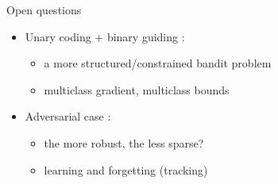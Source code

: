 \documentclass{beamer}
\begin{document}
%	
%		

\begin{frame}{Open questions}
	
	\begin{itemize}
		\item Unary coding + binary guiding :
		\begin{itemize}
			\item a more structured/constrained bandit problem
			\item multiclass gradient, multiclass bounds
		\end{itemize}
		\item Adversarial case :
		\begin{itemize}
			\item the more robust, the less sparse?
			\item learning and forgetting (tracking)
		\end{itemize}
     \end{itemize}
\end{frame}
\end{document}
